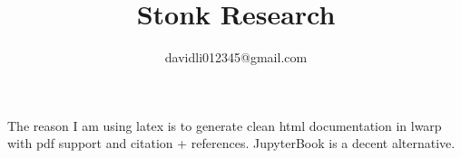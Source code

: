 \documentclass{book}
\title{Stonk Research}
\author{davidli012345@gmail.com}
\begin{document}
\maketitle                      %


 The reason I am using latex is to generate clean html documentation in lwarp with pdf support and citation + references. JupyterBook is a decent alternative.

\tableofcontents                %
\listoffigures





\begin{warpprint}   %
\cleardoublepage    %
{}
\end{warpprint}
\ForceHTMLPage      %
\ForceHTMLTOC       %
\printindex

\begin{warpprint}   %
\cleardoublepage    %
\end{warpprint}

\nocite{*}
\printbibliography

\end{document}
